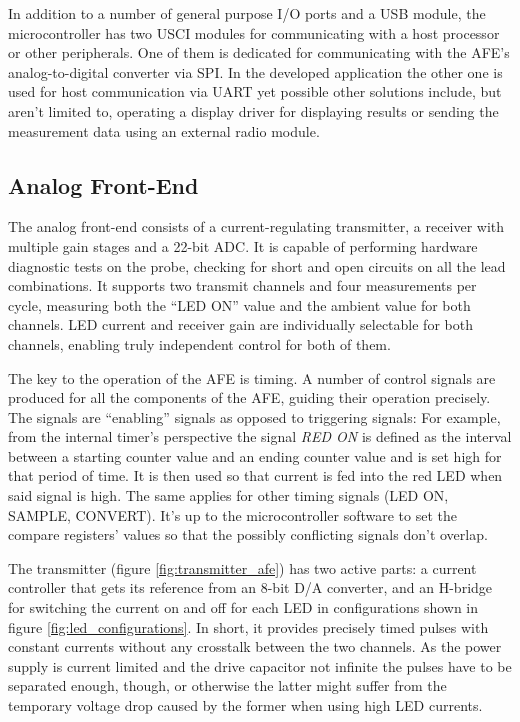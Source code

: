In addition to a number of general purpose I/O ports and a USB module, the microcontroller has two USCI modules for communicating with a host processor or other peripherals. One of them is dedicated for communicating with the AFE's analog-to-digital converter via SPI. In the developed application the other one is used for host communication via UART yet possible other solutions include, but aren't limited to, operating a display driver for displaying results or sending the measurement data using an external radio module.

\subsection{Analog Front-End}

The analog front-end consists of a current-regulating transmitter, a receiver with multiple gain stages and a 22-bit ADC. It is capable of performing hardware diagnostic tests on the probe, checking for short and open circuits on all the lead combinations. It supports two transmit channels and four measurements per cycle, measuring both the ``LED ON'' value and the ambient value for both channels. LED current and receiver gain are individually selectable for both channels, enabling truly independent control for both of them.

The key to the operation of the AFE is timing. A number of control signals are produced for all the components of the AFE, guiding their operation precisely. The signals are ``enabling'' signals as opposed to triggering signals: For example, from the internal timer's perspective the signal \textit{RED ON} is defined as the interval between a starting counter value and an ending counter value and is set high for that period of time. It is then used so that current is fed into the red LED when said signal is high. The same applies for other timing signals (LED ON, SAMPLE, CONVERT). It's up to the microcontroller software to set the compare registers' values so that the possibly conflicting signals don't overlap.


The transmitter (figure \ref{fig:transmitter_afe}) has two active parts: a current controller that gets its reference from an 8-bit D/A converter, and an H-bridge for switching the current on and off for each LED in configurations shown in figure \ref{fig:led_configurations}. In short, it provides precisely timed pulses with constant currents without any crosstalk between the two channels. As the power supply is current limited and the drive capacitor not infinite the pulses have to be separated enough, though, or otherwise the latter might suffer from the temporary voltage drop caused by the former when using high LED currents.

